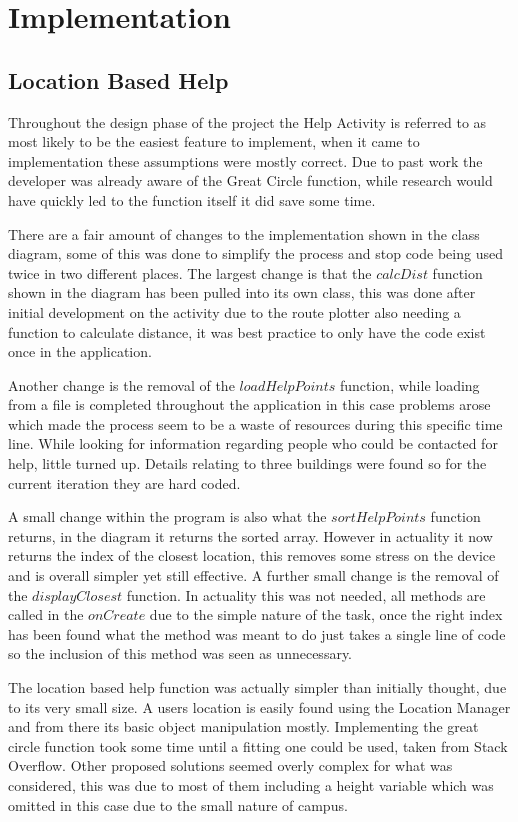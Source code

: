 \chapter{Implementation}

\section{Location Based Help}
Throughout the design phase of the project the Help Activity is referred to as most likely to be the easiest feature to implement, when it came to implementation these assumptions were mostly correct.  Due to past work the developer was already aware of the Great Circle function, while research would have quickly led to the function itself it did save some time. 

There are a fair amount of changes to the implementation shown in the class diagram, some of this was done to simplify the process and stop code being used twice in two different places. The largest change is that the $calcDist$ function shown in the diagram has been pulled into its own class, this was done after initial development on the activity due to the route plotter also needing a function to calculate distance, it was best practice to only have the code exist once in the application.

Another change is the removal of the $loadHelpPoints$ function, while loading from a file is completed throughout the application in this case problems arose which made the process seem to be a waste of resources during this specific time line. While looking for information regarding people who could be contacted for help, little turned up. Details relating to three buildings were found so for the current iteration they are hard coded. 

A small change within the program is also what the $sortHelpPoints$ function returns, in the diagram it returns the sorted array. However in actuality it now returns the index of the closest location, this removes some stress on the device and is overall simpler yet still effective. A further small change is the removal of the $displayClosest$ function. In actuality this was not needed, all methods are called in the $onCreate$ due to the simple nature of the task, once the right index has been found what the method was meant to do just takes a single line of code so the inclusion of this method was seen as unnecessary.

The location based help function was actually simpler than initially thought, due to its very small size. A users location is easily found using the Location Manager and from there its basic object manipulation mostly. Implementing the great circle function took some time until a fitting one could be used, taken from Stack Overflow. Other proposed solutions seemed overly complex for what was considered, this was due to most of them including a height variable which was omitted in this case due to the small nature of campus. 

